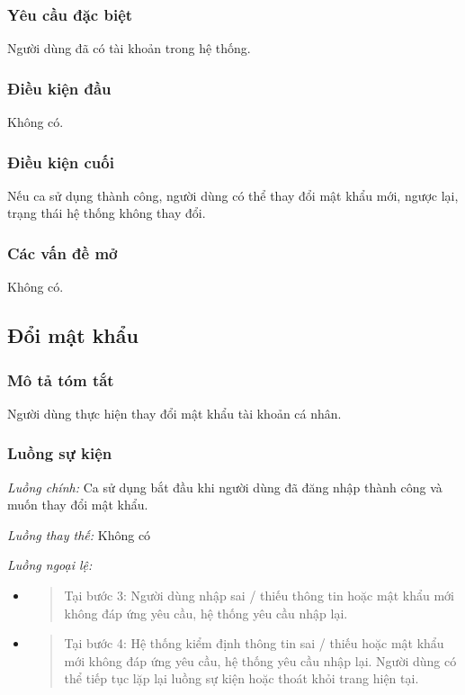 \documentclass[./../main.tex]{subfiles}
\begin{document}
\subsubsection*{Yêu cầu đặc biệt}

Người dùng đã có tài khoản trong hệ thống.

\subsubsection*{Điều kiện đầu}

Không có.

\subsubsection*{Điều kiện cuối}

Nếu ca sử dụng thành công, người dùng có thể thay đổi mật khẩu mới,
ngược lại, trạng thái hệ thống không thay đổi.

\subsubsection*{Các vấn đề mở}

Không có.

\subsection{Đổi mật khẩu}

\subsubsection*{Mô tả tóm tắt}

Người dùng thực hiện thay đổi mật khẩu tài khoản cá nhân.

\subsubsection*{Luồng sự kiện}

\emph{Luồng chính:} Ca sử dụng bắt đầu khi người dùng đã đăng nhập thành công và muốn thay đổi mật khẩu.

\emph{Luồng thay thế:} Không có

\emph{Luồng ngoại lệ:}

\begin{itemize}
\item
  \begin{quote}
  Tại bước 3: Người dùng nhập sai / thiếu thông tin hoặc mật khẩu mới
  không đáp ứng yêu cầu, hệ thống yêu cầu nhập lại.
  \end{quote}
\item
  \begin{quote}
  Tại bước 4: Hệ thống kiểm định thông tin sai / thiếu hoặc mật khẩu mới
  không đáp ứng yêu cầu, hệ thống yêu cầu nhập lại. Người dùng có thể
  tiếp tục lặp lại luồng sự kiện hoặc thoát khỏi trang hiện tại.
  \end{quote}
\end{itemize}
\end{document}
